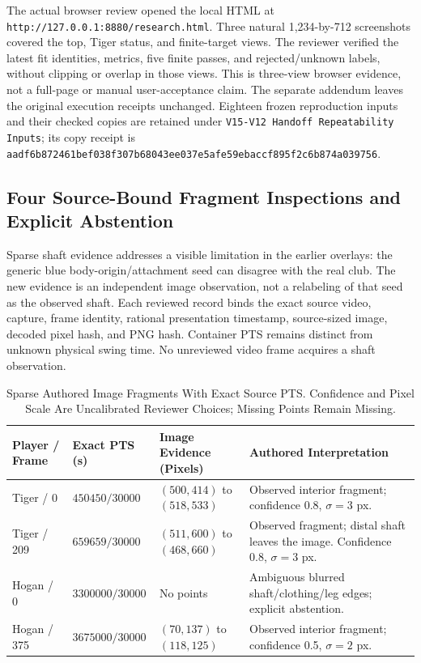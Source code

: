 \documentclass[11pt,letterpaper]{article}
\newcommand{\code}[1]{\nolinkurl{#1}}
\newcommand{\hash}[1]{{\footnotesize\nolinkurl{#1}}}
\begin{document}
The actual browser review opened the local HTML at
\code{http://127.0.0.1:8880/research.html}. Three natural 1,234-by-712
screenshots covered the top, Tiger status, and finite-target views. The
reviewer verified the latest fit identities, metrics, five finite passes, and
rejected/unknown labels, without clipping or overlap in those views. This is
three-view browser evidence, not a full-page or manual user-acceptance claim.
The separate addendum leaves the original execution receipts unchanged.
Eighteen frozen reproduction inputs and their checked copies are retained
under \code{V15-V12 Handoff Repeatability Inputs}; its copy receipt is
\hash{aadf6b872461bef038f307b68043ee037e5afe59ebaccf895f2c6b874a039756}.

\subsection{Four Source-Bound Fragment Inspections and Explicit Abstention}
Sparse shaft evidence addresses a visible limitation in the earlier overlays:
the generic blue body-origin/attachment seed can disagree with the real club.
The new evidence is an independent image observation, not a relabeling of that
seed as the observed shaft. Each reviewed record binds the exact source video,
capture, frame identity, rational presentation timestamp, source-sized image,
decoded pixel hash, and PNG hash. Container PTS remains distinct from unknown
physical swing time. No unreviewed video frame acquires a shaft observation.

\begin{table}[htbp]
\centering\small
\begin{tabular}{@{}p{0.75in}p{0.9in}p{2.05in}p{2.45in}@{}}
\toprule Player / Frame & Exact PTS (s) & Image Evidence (Pixels) & Authored Interpretation\\\midrule
Tiger / 0 & $450450/30000$ & $(500,414)$ to $(518,533)$ & Observed interior fragment; confidence 0.8, $\sigma=3$ px.\\
Tiger / 209 & $659659/30000$ & $(511,600)$ to $(468,660)$ & Observed fragment; distal shaft leaves the image. Confidence 0.8, $\sigma=3$ px.\\
Hogan / 0 & $3300000/30000$ & No points & Ambiguous blurred shaft/clothing/leg edges; explicit abstention.\\
Hogan / 375 & $3675000/30000$ & $(70,137)$ to $(118,125)$ & Observed interior fragment; confidence 0.5, $\sigma=2$ px.\\
\bottomrule
\end{tabular}
\caption{Sparse Authored Image Fragments With Exact Source PTS. Confidence and Pixel Scale Are Uncalibrated Reviewer Choices; Missing Points Remain Missing.}
\end{table}
\end{document}
